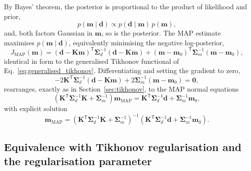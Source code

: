 By Bayes' theorem, the posterior is proportional to the product of likelihood and prior,
\begin{equation}
p(\mathbf{m}\mid\mathbf{d}) \propto p(\mathbf{d}\mid\mathbf{m})\,p(\mathbf{m}),
\end{equation}
and, both factors Gaussian in $\mathbf{m}$, so is the posterior. The MAP estimate maximises $p(\mathbf{m}\mid\mathbf{d})$, equivalently minimising the negative log-posterior,
\begin{equation}
J_{\mathrm{MAP}}(\mathbf{m}) = (\mathbf{d}-\mathbf{K}\mathbf{m})^{\mathsf{T}}\boldsymbol{\Sigma}_{d}^{-1}(\mathbf{d}-\mathbf{K}\mathbf{m}) + (\mathbf{m}-\mathbf{m}_{0})^{\mathsf{T}}\boldsymbol{\Sigma}_{m}^{-1}(\mathbf{m}-\mathbf{m}_{0}),
\label{eq:map_functional}
\end{equation}
identical in form to the generalised Tikhonov functional of Eq.~\eqref{eq:generalised_tikhonov}. Differentiating and setting the gradient to zero,
\begin{equation}
-2\mathbf{K}^{\mathsf{T}}\boldsymbol{\Sigma}_{d}^{-1}(\mathbf{d}-\mathbf{K}\mathbf{m}) + 2\boldsymbol{\Sigma}_{m}^{-1}(\mathbf{m}-\mathbf{m}_{0}) = \mathbf{0},
\end{equation}
rearranges, exactly as in Section~\ref{sec:tikhonov}, to the MAP normal equations
\begin{equation}
\left(\mathbf{K}^{\mathsf{T}}\boldsymbol{\Sigma}_{d}^{-1}\mathbf{K} + \boldsymbol{\Sigma}_{m}^{-1}\right)\mathbf{m}_{\mathrm{MAP}} = \mathbf{K}^{\mathsf{T}}\boldsymbol{\Sigma}_{d}^{-1}\mathbf{d} + \boldsymbol{\Sigma}_{m}^{-1}\mathbf{m}_{0},
\end{equation}
with explicit solution
\begin{equation}
\boxed{\mathbf{m}_{\mathrm{MAP}} = \left(\mathbf{K}^{\mathsf{T}}\boldsymbol{\Sigma}_{d}^{-1}\mathbf{K} + \boldsymbol{\Sigma}_{m}^{-1}\right)^{-1}\left(\mathbf{K}^{\mathsf{T}}\boldsymbol{\Sigma}_{d}^{-1}\mathbf{d} + \boldsymbol{\Sigma}_{m}^{-1}\mathbf{m}_{0}\right)}.
\label{eq:map_solution}
\end{equation}

\subsection{Equivalence with Tikhonov regularisation and the regularisation parameter}


